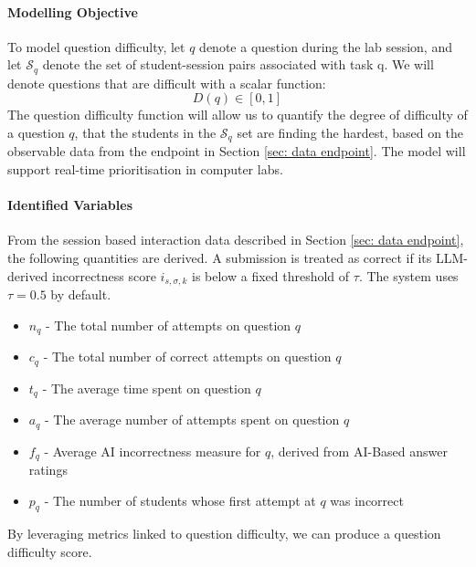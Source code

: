 \paragraph{Modelling Objective}
To model question difficulty, let $q$ denote a question during the lab session, and let $\mathcal{S}_q$ denote the set of student-session pairs associated with task q. We will denote questions that are difficult with a scalar function:
\begin{equation}
    D(q) \in [0,1]
\end{equation}
The question difficulty function will allow us to quantify the degree of difficulty of a question $q$, that the students in the $\mathcal{S}_q$ set are finding the hardest, based on the observable data from the endpoint in Section \ref{sec: data endpoint}. The model will support real-time prioritisation in computer labs.

\paragraph{Identified Variables}
From the session based interaction data described in Section \ref{sec: data endpoint}, the following quantities are derived. 
A submission is treated as correct if its LLM-derived incorrectness score $i_{s,\sigma,k}$ is below a fixed threshold of $\tau$. 
The system uses $\tau = 0.5$ by default.
\begin{itemize}
    \item $n_{q}$ - The total number of attempts on question $q$
    \item $c_{q}$ - The total number of correct attempts on question $q$
    \item $t_{q}$ - The average time spent on question $q$
    \item $a_{q}$ - The average number of attempts spent on question $q$
    \item $f_{q}$ - Average AI incorrectness measure for $q$, derived from AI-Based answer ratings
    \item $p_{q}$ - The number of students whose first attempt at $q$ was incorrect
\end{itemize}
By leveraging metrics linked to question difficulty, we can produce a question difficulty score.

